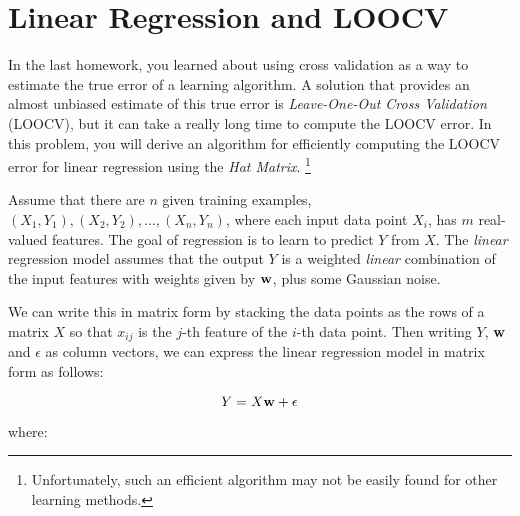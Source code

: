 \section{Linear Regression and LOOCV}


In the last homework, you learned about using cross validation as a
way to estimate the true error of a learning algorithm.  A solution
that provides an almost unbiased estimate of this true error is
\emph{Leave-One-Out Cross Validation} (LOOCV), but it can take a
really long time to compute the LOOCV error.  In this problem, you
will derive an algorithm for efficiently computing the LOOCV error for
linear regression using the \emph{Hat Matrix}.
\footnote{Unfortunately, such an efficient algorithm may not
be easily found for other learning methods.}

Assume that there are $n$ given training examples,
$(X_1,Y_1),(X_2,Y_2),\dots,(X_n,Y_n)$, where each input data point
$X_i$, has $m$ real-valued features.  The goal of regression is to
learn to predict $Y$ from $X$.  The \emph{linear} regression model
assumes that the output $Y$ is a weighted \emph{linear} combination of
the input features with weights given by $\mathbf{w}$, plus some Gaussian
noise.

We can write this in matrix form by stacking the data points as the
rows of a matrix $X$ so that $x_{ij}$ is the $j$-th feature of the
$i$-th data point.  Then writing $Y$, $\mathbf{w}$ and $\epsilon$ as column
vectors, we can express the linear regression model in matrix form as
follows:

\[
Y=X\mathbf{w} + \epsilon
\]

where:

